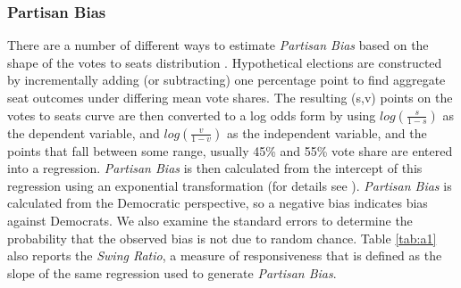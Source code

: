 \subsubsection*{Partisan Bias}
There are a number of different ways to estimate \textit{Partisan Bias} based on the shape of the votes to seats distribution \citep{Grofman1983, Browning_King_1987_seats_votes, GelmanKing1994_unifiedAJPS, Grofman_et_al_1997_SwingRatio_Bias, Zingher2016_bias_swingratio_JEPP}.  Hypothetical elections are constructed by incrementally adding (or subtracting) one percentage point to find aggregate seat outcomes under differing mean vote shares.  The resulting (s,v) points on the votes to seats curve are then converted to a log odds form by using $ log(\frac{s}{1-s}) $ as the dependent variable, and $ log(\frac{v}{1-v}) $ as the independent variable, and the points that fall between some range, usually 45\% and 55\% vote share are entered into a regression.  \textit{Partisan Bias} is then calculated from the intercept of this regression using an exponential transformation (for details see \citet{Grofman1983}). \textit{Partisan Bias} is calculated from the Democratic perspective, so a negative bias indicates bias against Democrats. We also examine the standard errors to determine the probability that the observed bias is not due to random chance. Table \ref{tab:a1} also reports the \textit{Swing Ratio}, a measure of responsiveness that is defined as the slope of the same regression used to generate \textit{Partisan Bias}. 



